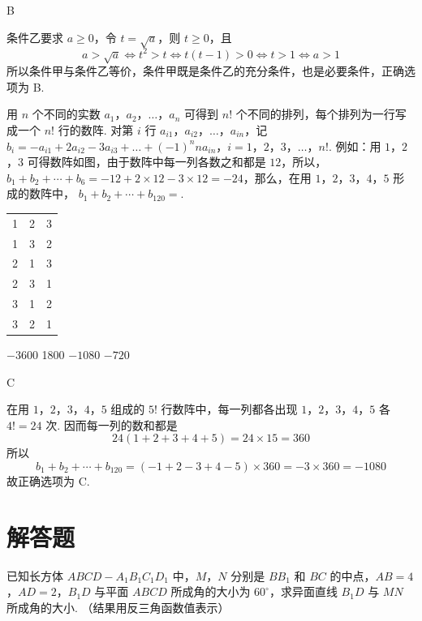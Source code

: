 \begin{answer}
B
\end{answer}

\begin{solution}
条件乙要求 \(a\geqslant0\)，令 \(t=\sqrt a\)，则 \(t\geqslant0\)，且
\[
a>\sqrt a\iff t^2>t\iff t(t-1)>0\iff t>1\iff a>1
\]
所以条件甲与条件乙等价，条件甲既是条件乙的充分条件，也是必要条件，正确选项为 B.
\end{solution}

\begin{problem}
用 \(n\) 个不同的实数 \(a_1\)，\(a_2\)，\(\dots\)，\(a_n\) 可得到 \(n!\) 个不同的排列，每个排列为一行写成一个 \(n!\) 行的数阵. 对第 \(i\) 行 \(a_{i1}\)，\(a_{i2}\)，\(\dots\)，\(a_{in}\)，记 \(b_i = -a_{i1} + 2a_{i2} - 3a_{i3} + \dots + (-1)^n n a_{in}\)，\(i = 1\)，\(2\)，\(3\)，\(\dots\)，\(n!\). 例如：用 \(1\)，\(2\)，\(3\) 可得数阵如图，由于数阵中每一列各数之和都是 \(12\)，所以，\(b_1 + b_2 + \cdots + b_6 = -12 + 2 \times 12 - 3 \times 12 = -24\)，那么，在用 \(1\)，\(2\)，\(3\)，\(4\)，\(5\) 形成的数阵中，
\(b_1 + b_2 + \cdots + b_{120} = \)\fillinblank{}.

\begin{center}
\begin{tabular}{ccc}
1 & 2 & 3 \\
1 & 3 & 2 \\
2 & 1 & 3 \\
2 & 3 & 1 \\
3 & 1 & 2 \\
3 & 2 & 1
\end{tabular}
\end{center}

\choices
    {\(-3600\)}
    {1800}
    {\(-1080\)}
    {\(-720\)}
\end{problem}

\begin{answer}
C
\end{answer}

\begin{solution}
在用 \(1\)，\(2\)，\(3\)，\(4\)，\(5\) 组成的 \(5!\) 行数阵中，每一列都各出现 \(1\)，\(2\)，\(3\)，\(4\)，\(5\) 各 \(4!=24\) 次. 因而每一列的数和都是
\[
24(1+2+3+4+5)=24\times15=360
\]
所以
\[
b_1+b_2+\cdots+b_{120}=\left(-1+2-3+4-5\right)\times360=-3\times360=-1080
\]
故正确选项为 C.
\end{solution}

\section{解答题}
\begin{problem}
已知长方体 \(ABCD-A_{1}B_{1}C_{1}D_{1}\) 中，\(M\)，\(N\) 分别是 \(BB_{1}\) 和 \(BC\) 的中点，\(AB = 4\)，\(AD = 2\)，\(B_{1}D\) 与平面 \(ABCD\) 所成角的大小为 \(60^{\circ}\)，求异面直线 \(B_{1}D\) 与 \(MN\) 所成角的大小. （结果用反三角函数值表示）
\end{problem}


